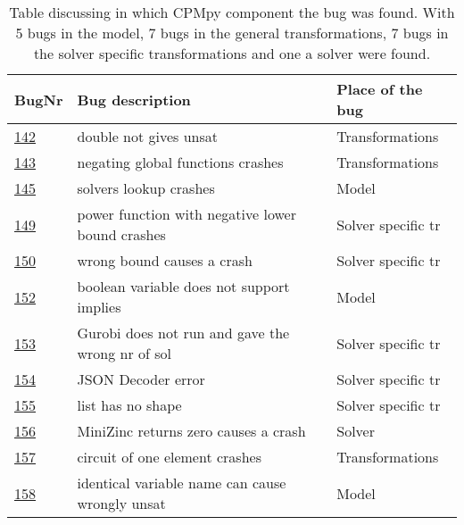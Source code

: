 \begin{table}[]
	\centering
	\caption{Table discussing in which CPMpy component the bug was found. With 5 bugs in the model, 7 bugs in the general transformations, 7 bugs in the solver specific transformations and one a solver were found.}
	\label{tab:bug:placeComponent}
	\begin{tabular}{lll}
		\hline
		BugNr & Bug description                                         & Place of the bug \\ \toprule
		\href{https://github.com/CPMpy/cpmpy/issues/142}{142} & double not gives unsat                            & Transformations     \\
		\href{https://github.com/CPMpy/cpmpy/issues/143}{143} & negating global functions crashes                 & Transformations     \\
		\href{https://github.com/CPMpy/cpmpy/issues/145}{145} & solvers lookup crashes                            & Model              \\
		\href{https://github.com/CPMpy/cpmpy/issues/149}{149} & power function with negative lower bound crashes  & Solver specific tr \\
		\href{https://github.com/CPMpy/cpmpy/issues/150}{150} & wrong bound causes a crash                  & Solver specific tr \\
		\href{https://github.com/CPMpy/cpmpy/issues/152}{152} & boolean variable does not support implies         & Model              \\
		\href{https://github.com/CPMpy/cpmpy/issues/153}{153} & Gurobi does not run and gave the wrong nr of sol  & Solver specific tr \\
		\href{https://github.com/CPMpy/cpmpy/issues/154}{154} & JSON Decoder error                                & Solver specific tr \\
		\href{https://github.com/CPMpy/cpmpy/issues/155}{155} & list has no shape                                 & Solver specific tr \\
		\href{https://github.com/CPMpy/cpmpy/issues/156}{156} & MiniZinc returns zero causes a crash              & Solver             \\
		\href{https://github.com/CPMpy/cpmpy/issues/157}{157} & circuit of one element crashes                    & Transformations     \\
		\href{https://github.com/CPMpy/cpmpy/issues/158}{158} & identical variable name can cause wrongly unsat   & Model              \\

\end{tabular}
\end{table}
